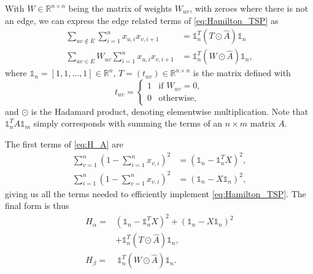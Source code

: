 With $W \in \mathbb{R}^{n \times n}$ being the matrix of weights $W_{uv}$, with zeroes where there is not an edge, we can express the edge related terms of \eqref{eq:Hamilton_TSP} as
\begin{equation}
\begin{split}
    \sum_{uv \notin E}\sum_{i = 1}^n x_{u,i}x_{v,i+1} &= \mathds{1}_n^T \left( T \odot \hat{A} \right) \mathds{1}_n \\
    \sum_{uv \in E} W_{uv} \sum_{i = 1}^n x_{u,i}x_{v,i+1} &= \mathds{1}_n^T \left( W \odot \hat{A} \right) \mathds{1}_n,
\end{split}
\end{equation}
where $\mathds{1}_n = [1, 1, \ldots, 1] \in \mathbb{R}^{n}$, $T = (t_{uv}) \in \mathbb{R}^{n \times n}$ is the matrix defined with
\begin{equation}
    t_{uv} =
    \begin{cases}
        1 & \text{if } W_{uv} = 0, \\
        0 & \text{otherwise},
    \end{cases}
\end{equation}
and $\odot$ is the Hadamard product, denoting elementwise multiplication.
Note that $\mathds{1}_n^T A \mathds{1}_m$ simply corresponds with summing the terms of an $n \times m$ matrix $A$.

The first terms of \eqref{eq:H_A} are
\begin{equation}
\begin{split}
    \sum_{v = 1}^n \left( 1 - \sum_{i = 1}^n x_{v,i} \right)^2 &= \left( \mathds{1}_n - \mathds{1}_n^T X \right)^2, \\
    \sum_{i = 1}^n \left( 1 - \sum_{v = 1}^n x_{v,i} \right)^2 &= \left( \mathds{1}_n - X\mathds{1}_n \right)^2,
\end{split}
\end{equation}
giving us all the terms needed to efficiently implement \eqref{eq:Hamilton_TSP}. The final form is thus
\begin{equation}
\begin{split}
    H_{\alpha} =&  \left( \mathds{1}_n - \mathds{1}_n^T X \right)^2 + \left( \mathds{1}_n - X\mathds{1}_n \right)^2 \\
    &+ \mathds{1}_n^T \left( T \odot \hat{A} \right)\mathds{1}_n, \\
    H_{\beta} =& \ \mathds{1}_n^T \left( W \odot \hat{A} \right) \mathds{1}_n.
\end{split}
\end{equation}

